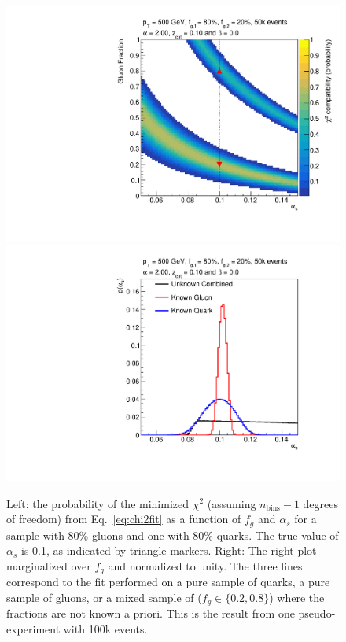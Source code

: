 \begin{figure}[h!]
\begin{center}
\includegraphics[width = 0.49\columnwidth]{figures/banana_alpha_20beta_0_zcut_123451324.pdf}\includegraphics[width = 0.49\columnwidth]{figures/palpha_alpha_20beta_0_zcut_123451324.pdf}
\end{center}
\caption{Left: the probability of the minimized $\chi^2$ (assuming
  $n_\text{bins}-1$ degrees of freedom) from Eq.~\ref{eq:chi2fit} as a
  function of $f_g$ and $\alpha_s$ for a sample with 80\% gluons and
  one with 80\% quarks.  The true value of $\alpha_s$ is 0.1, as indicated by triangle markers.  Right: The right plot marginalized over $f_g$
  and normalized to unity.  The three lines correspond to the fit performed on a pure sample of quarks, a pure sample of gluons, or a mixed sample of ($f_g\in\{0.2,0.8\}$) where the fractions are not known a priori.  This is the result from one pseudo-experiment with 100k events.}
\label{fig:alpha2fit}
\end{figure}


